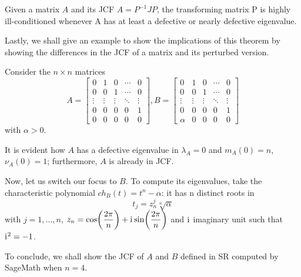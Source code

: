 \begin{theorem}\label{thm:stability-jcf}
    Given a matrix \(A\) and its JCF \(A = P^{-1}JP\), the transforming matrix P is highly ill-conditioned
    whenever A has at least a defective or nearly defective eigenvalue.
\end{theorem}

Lastly, we shall give an example to show the implications of this theorem by showing the differences in
the JCF of a matrix and its perturbed version.

\begin{example}
Consider the \(n \times n\) matrices
\[
    A =
    \begin{bmatrix}
            0       &      1       &    0     &   \cdots   &    0    \\
            0       &      0       &    1     &   \cdots   &    0    \\
        \vdots      &    \vdots    &  \vdots  &   \ddots   & \vdots  \\
            0       &       0      &     0    &     0      &    1    \\
            0       &       0      &     0    &     0      &    0
    \end{bmatrix},
    B =
    \begin{bmatrix}
        0       &      1       &    0     &   \cdots   &    0    \\
        0       &      0       &    1     &   \cdots   &    0    \\
     \vdots     &    \vdots    &  \vdots  &   \ddots   & \vdots  \\
        0       &       0      &     0    &     0      &    1    \\
      \alpha    &       0      &     0    &     0      &    0
    \end{bmatrix}
\]
with \(\alpha > 0\).

It is evident how \(A\) has a defective eigenvalue in \(\lambda_{A} = 0\) and \(m_{A}(0) = n\), \(\nu_{A}(0) = 1\); furthermore,
\(A\) is already in JCF.

Now, let us switch our focus to \(B\). To compute its eigenvalues, take the characteristic polynomial
\(ch_{B}(t) = t^n - \alpha\): it has n distinct roots in
\[
    t_{j} = z_{n}^{j} \sqrt[n]{\alpha}
\]
with \(j = 1, ..., n\), \(z_{n} = \cos(\dfrac{2\pi}{n}) + \mathrm{i}\mkern1mu \sin(\dfrac{2\pi}{n})\) and
\(\mathrm{i}\mkern1mu\) imaginary unit such that \(\mathrm{i}\mkern1mu^2 = -1\).

To conclude, we shall show the JCF of \(A\) and \(B\) defined in SR computed by SageMath when \(n = 4\).


\end{example}
